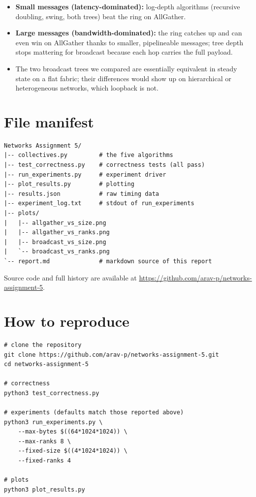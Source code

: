 \documentclass[11pt]{article}
\newcommand{\repourl}{https://github.com/arav-p/networks-assignment-5}
\begin{document}
\begin{itemize}
  \item \textbf{Small messages (latency-dominated):} log-depth algorithms
        (recursive doubling, swing, both trees) beat the ring on AllGather.
  \item \textbf{Large messages (bandwidth-dominated):} the ring catches up and
        can even win on AllGather thanks to smaller, pipelineable messages;
        tree depth stops mattering for broadcast because each hop carries
        the full payload.
  \item The two broadcast trees we compared are essentially equivalent in
        steady state on a flat fabric; their differences would show up on
        hierarchical or heterogeneous networks, which loopback is not.
\end{itemize}

\section{File manifest}

\begin{Verbatim}[fontsize=\small]
Networks Assignment 5/
|-- collectives.py         # the five algorithms
|-- test_correctness.py    # correctness tests (all pass)
|-- run_experiments.py     # experiment driver
|-- plot_results.py        # plotting
|-- results.json           # raw timing data
|-- experiment_log.txt     # stdout of run_experiments
|-- plots/
|   |-- allgather_vs_size.png
|   |-- allgather_vs_ranks.png
|   |-- broadcast_vs_size.png
|   `-- broadcast_vs_ranks.png
`-- report.md              # markdown source of this report
\end{Verbatim}

Source code and full history are available at
\href{\repourl}{\repourl}.

\section{How to reproduce}

\begin{Verbatim}[fontsize=\small]
# clone the repository
git clone https://github.com/arav-p/networks-assignment-5.git
cd networks-assignment-5

# correctness
python3 test_correctness.py

# experiments (defaults match those reported above)
python3 run_experiments.py \
    --max-bytes $((64*1024*1024)) \
    --max-ranks 8 \
    --fixed-size $((4*1024*1024)) \
    --fixed-ranks 4

# plots
python3 plot_results.py
\end{Verbatim}
\end{document}

